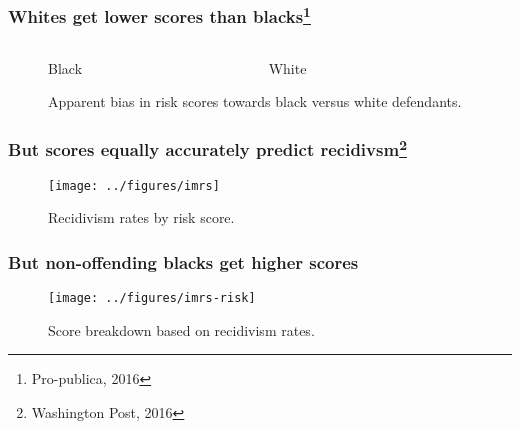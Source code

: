\begin{frame}
  \frametitle{Whites get lower scores than blacks\footnote{Pro-publica, 2016}}
  \begin{figure}[H]
    \begin{columns}
      \begin{column}{0.5\textwidth}
        \centering
        \def\svgwidth{.95\columnwidth}
        
        Black
      \end{column}
      \begin{column}{0.5\textwidth}
        \centering
        \def\svgwidth{0.95\columnwidth}
              
        White
      \end{column}
    \end{columns}
    \label{fig:risk-bias}
    \caption{Apparent bias in risk scores towards black versus white defendants.}
  \end{figure}
\end{frame}

\begin{frame}
  \frametitle{But scores equally accurately predict recidivsm\footnote{Washington Post, 2016}}
  \begin{figure}[H]
    \centering
    \texttt{[image: ../figures/imrs]}
    \caption{Recidivism rates by risk score.}
    \label{fig:imrs}
  \end{figure}
\end{frame}
\begin{frame}
  \frametitle{But non-offending blacks get higher scores}
  \begin{figure}[H]
    \centering
    \texttt{[image: ../figures/imrs-risk]}
    \caption{Score breakdown based on recidivism rates.}
    \label{fig:imrs-risk}
  \end{figure}
\end{frame}

